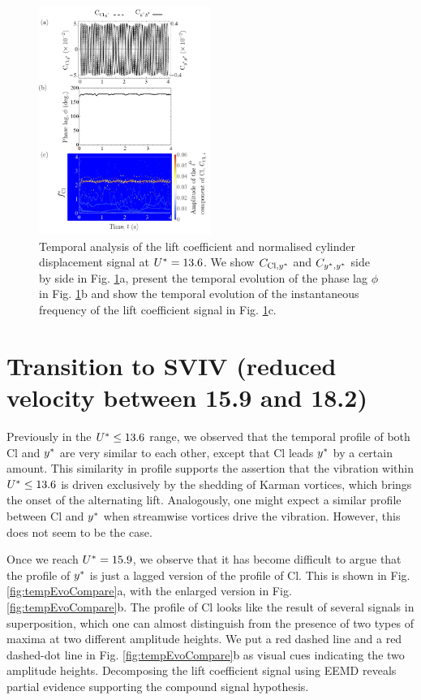 \documentclass[oneside]{utmthesis}
\begin{document}
\begin{figure}
  \centering
  \includegraphics[width=0.5\textwidth]{figs/tempAnalysisLower}
  \caption{Temporal analysis of the lift coefficient and normalised cylinder displacement signal at $U^{*} = 13.6$. We show $C_{\text{Cl},y^{*}}$ and $C_{y^{*},y^{*}}$ side by side in Fig. \ref{fig:tempAnalysisLower}a, present the temporal evolution of the phase lag $\phi$ in Fig. \ref{fig:tempAnalysisLower}b and show the temporal evolution of the instantaneous frequency of the lift coefficient signal in Fig. \ref{fig:tempAnalysisLower}c.} \label{fig:tempAnalysisLower}
\end{figure}

\section{Transition to SVIV (reduced velocity between 15.9 and 18.2)} \label{sec:transSVIV}
Previously in the $U^{*} \leq 13.6$ range, we observed that the temporal profile of both Cl and  $y^{*}$ are very similar to each other, except that Cl leads $y^{*}$ by a certain amount. This similarity in profile supports the assertion that the vibration within $U^{*} \leq 13.6$ is driven exclusively by the shedding of Karman vortices, which brings the onset of the alternating lift. Analogously, one might expect a similar profile between Cl and $y^{*}$ when streamwise vortices drive the vibration. However, this does not seem to be the case.

Once we reach $U^{*} = 15.9$, we observe that it has become difficult to argue that the profile of $y^{*}$ is just a lagged version of the profile of Cl. This is shown in Fig. \ref{fig:tempEvoCompare}a, with the enlarged version in Fig. \ref{fig:tempEvoCompare}b. The profile of Cl looks like the result of several signals in superposition, which one can almost distinguish from the presence of two types of maxima at two different amplitude heights. We put a red dashed line and a red dashed-dot line in Fig. \ref{fig:tempEvoCompare}b as visual cues indicating the two amplitude heights. Decomposing the lift coefficient signal using EEMD reveals partial evidence supporting the compound signal hypothesis.
\end{document}
